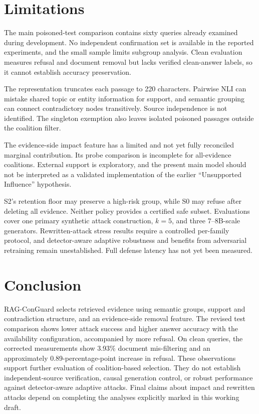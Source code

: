 \documentclass[sigconf]{acmart}
\newif\ifrevisionnotes
\newcommand{\verification}[1]{%
  \ifrevisionnotes
    \par\smallskip\noindent
    {\small\color{red!65!black}\textbf{Verification pending.} #1}\par\smallskip
  \fi}
\begin{document}
\verification{The supplied TeX references \texttt{rag-conguard.bib}, but the bibliography file and the baseline papers were not attached. Existing citation keys are retained without inventing entries. Complete and verify the poisoning, graph-defense, attribution, and TrustRAG references before making priority or reproduction-fidelity claims.}

\section{Limitations}

The main poisoned-test comparison contains sixty queries already examined during development. No independent confirmation set is available in the reported experiments, and the small sample limits subgroup analysis. Clean evaluation measures refusal and document removal but lacks verified clean-answer labels, so it cannot establish accuracy preservation.

The representation truncates each passage to 220 characters. Pairwise NLI can mistake shared topic or entity information for support, and semantic grouping can connect contradictory nodes transitively. Source independence is not identified. The singleton exemption also leaves isolated poisoned passages outside the coalition filter.

The evidence-side impact feature has a limited and not yet fully reconciled marginal contribution. Its probe comparison is incomplete for all-evidence coalitions. External support is exploratory, and the present main model should not be interpreted as a validated implementation of the earlier ``Unsupported Influence'' hypothesis.

S2's retention floor may preserve a high-risk group, while S0 may refuse after deleting all evidence. Neither policy provides a certified safe subset. Evaluations cover one primary synthetic attack construction, $k=5$, and three 7--8B-scale generators. Rewritten-attack stress results require a controlled per-family protocol, and detector-aware adaptive robustness and benefits from adversarial retraining remain unestablished. Full defense latency has not yet been measured.

\section{Conclusion}

RAG-ConGuard selects retrieved evidence using semantic groups, support and contradiction structure, and an evidence-side removal feature. The revised test comparison shows lower attack success and higher answer accuracy with the availability configuration, accompanied by more refusal. On clean queries, the corrected measurements show 3.93\% document mis-filtering and an approximately 0.89-percentage-point increase in refusal. These observations support further evaluation of coalition-based selection. They do not establish independent-source verification, causal generation control, or robust performance against detector-aware adaptive attacks. Final claims about impact and rewritten attacks depend on completing the analyses explicitly marked in this working draft.



\end{document}
